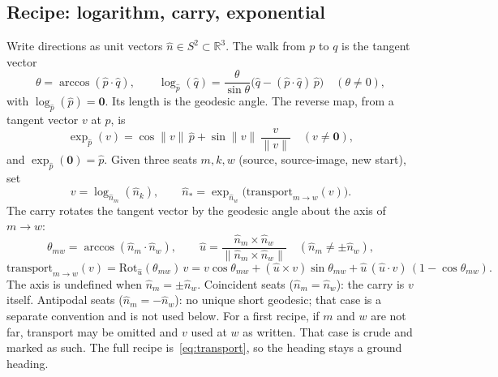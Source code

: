 \documentclass[12pt, a4paper]{article}
\begin{document}
\subsection{Recipe: logarithm, carry, exponential}
\label{subsec:offset_logexp}
Write directions as unit vectors $\hat n\in S^2\subset\mathbb{R}^3$.
The walk from $p$ to $q$ is the tangent vector
\begin{equation}
    \theta = \arccos(\hat p\cdot\hat q),
    \qquad
    \log_{\hat p}(\hat q)
    = \frac{\theta}{\sin\theta}\bigl(\hat q-(\hat p\cdot\hat q)\,\hat p\bigr)
    \quad (\theta\neq 0),
    \label{eq:sphere_log}
\end{equation}
with $\log_{\hat p}(\hat p)=\mathbf{0}$. Its length is the geodesic
angle. The reverse map, from a tangent vector $v$ at $p$, is
\begin{equation}
    \exp_{\hat p}(v)
    = \cos\|v\|\,\hat p + \sin\|v\|\,\frac{v}{\|v\|}
    \quad (v\neq\mathbf{0}),
    \label{eq:sphere_exp}
\end{equation}
and $\exp_{\hat p}(\mathbf{0})=\hat p$. Given three seats
$m,k,w$ (source, source-image, new start), set
\begin{equation}
    v = \log_{\hat n_m}(\hat n_k),
    \qquad
    \hat n_{*}
    = \exp_{\hat n_w}\bigl(\mathrm{transport}_{m\to w}(v)\bigr).
    \label{eq:analogical_offset}
\end{equation}
The carry rotates the tangent vector by the geodesic angle about the
axis of $m\to w$:
\begin{equation}
    \theta_{mw} = \arccos(\hat n_m\cdot\hat n_w),
    \qquad
    \hat u
    = \frac{\hat n_m\times\hat n_w}{\|\hat n_m\times\hat n_w\|}
    \quad (\hat n_m\neq\pm\hat n_w),
    \label{eq:transport_axis}
\end{equation}
\begin{equation}
    \mathrm{transport}_{m\to w}(v)
    = \mathrm{Rot}_{\hat u}(\theta_{mw})\, v
    = v\cos\theta_{mw}
      + (\hat u\times v)\sin\theta_{mw}
      + \hat u\,(\hat u\cdot v)\,(1-\cos\theta_{mw}).
    \label{eq:transport}
\end{equation}
The axis is undefined when $\hat n_m=\pm\hat n_w$.
Coincident seats ($\hat n_m=\hat n_w$): the carry is $v$ itself.
Antipodal seats ($\hat n_m=-\hat n_w$): no unique short geodesic;
that case is a separate convention and is not used below.
For a first recipe, if $m$ and $w$ are not far, transport may be
omitted and $v$ used at $w$ as written. That case is crude and
marked as such. The full recipe is~\eqref{eq:transport}, so the
heading stays a ground heading.
\end{document}
